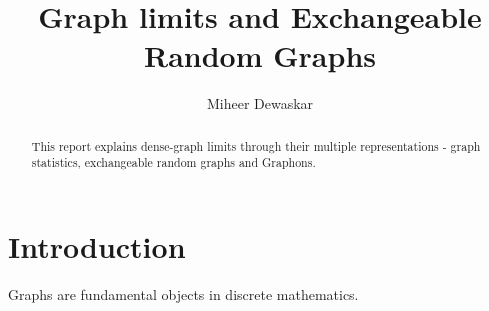 \documentclass{article}
\title{Graph limits and Exchangeable Random Graphs}
\author{Miheer Dewaskar}
\begin{document}
\maketitle
\begin{abstract}
  This report explains dense-graph limits through their multiple representations - graph statistics, exchangeable random graphs and Graphons.
\end{abstract}

\section{Introduction}

Graphs are fundamental objects in discrete mathematics. 






\end{document}
